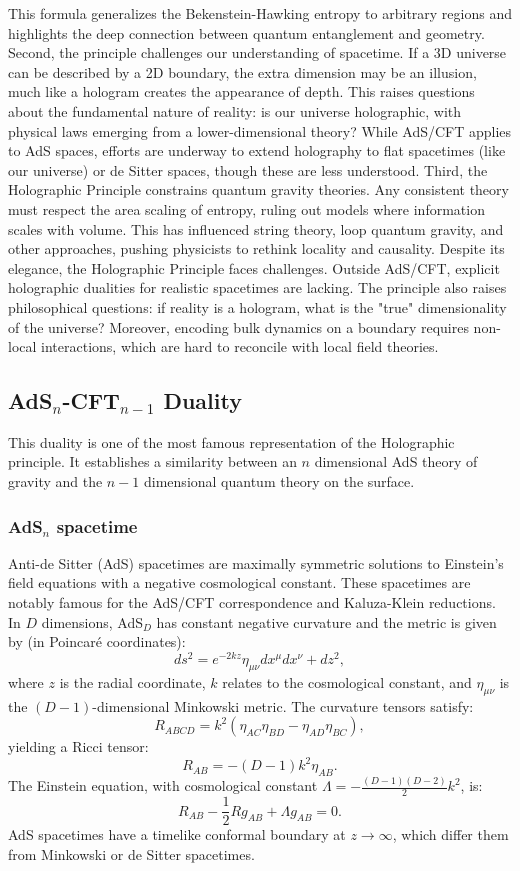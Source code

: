 This formula generalizes the Bekenstein-Hawking entropy to arbitrary regions and highlights the deep connection between quantum entanglement and geometry.
Second, the principle challenges our understanding of spacetime. If a 3D universe can be described by a 2D boundary, the extra dimension may be an illusion, much like a hologram creates the appearance of depth. This raises questions about the fundamental nature of reality: is our universe holographic, with physical laws emerging from a lower-dimensional theory? While AdS/CFT applies to AdS spaces, efforts are underway to extend holography to flat spacetimes (like our universe) or de Sitter spaces, though these are less understood.
Third, the Holographic Principle constrains quantum gravity theories. Any consistent theory must respect the area scaling of entropy, ruling out models where information scales with volume. This has influenced string theory, loop quantum gravity, and other approaches, pushing physicists to rethink locality and causality.
Despite its elegance, the Holographic Principle faces challenges. Outside AdS/CFT, explicit holographic dualities for realistic spacetimes are lacking. The principle also raises philosophical questions: if reality is a hologram, what is the "true" dimensionality of the universe? Moreover, encoding bulk dynamics on a boundary requires non-local interactions, which are hard to reconcile with local field theories.

\subsection{AdS$_n$-CFT$_{n-1}$ Duality}

This duality is one of the most famous representation of the Holographic principle. It establishes a similarity between an $n$ dimensional AdS theory of gravity and the $n-1$ dimensional quantum theory on the surface.  

\subsubsection{AdS$_n$ spacetime}

Anti-de Sitter (AdS) spacetimes are maximally symmetric solutions to Einstein's field equations with a negative cosmological constant. These spacetimes are notably famous for the AdS/CFT correspondence and Kaluza-Klein reductions. In $D$ dimensions, AdS$_D$ has constant negative curvature and the metric is given by (in Poincaré coordinates):
\[
ds^2= e^{-2kz} \eta_{\mu\nu} dx^\mu dx^\nu + dz^2,
\] 
where $z$ is the radial coordinate, $k$ relates to the cosmological constant, and $\eta_{\mu\nu}$ is the $(D-1)$-dimensional Minkowski metric. The curvature tensors satisfy:
\[
R_{ABCD} = k^2 (\eta_{AC} \eta_{BD} - \eta_{AD} \eta_{BC}),
\]
yielding a Ricci tensor:
\[
R_{AB} = - (D-1) k^2 \eta_{AB}.
\]
The Einstein equation, with cosmological constant $\Lambda = -\frac{(D-1)(D-2)}{2} k^2$, is:
\[
R_{AB} - \frac{1}{2} R g_{AB} + \Lambda g_{AB} = 0.
\]
AdS spacetimes have a timelike conformal boundary at $z \to \infty$, which differ them from Minkowski or de Sitter spacetimes.

